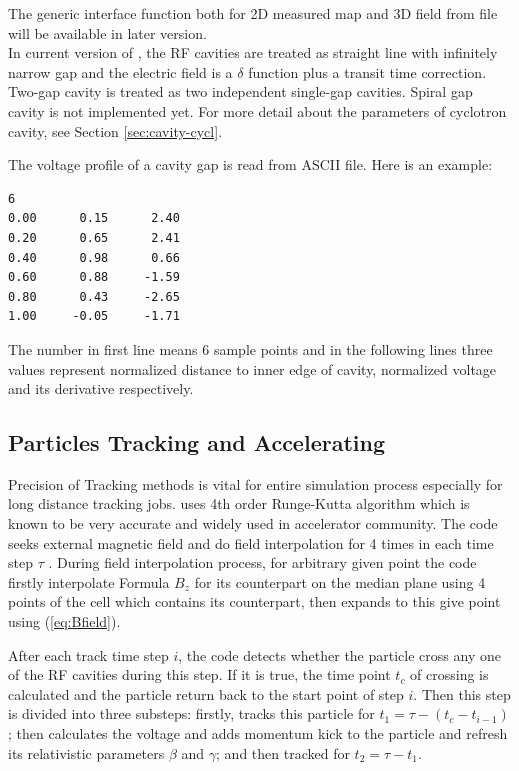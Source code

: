 The generic interface function both for 2D measured map and 3D field from file will be available in later version.\\ 

In current version of \opalcycl, the RF cavities are treated as straight line with infinitely narrow gap 
and the electric field is a $\delta$ function plus a transit time correction.
Two-gap cavity is treated as two independent single-gap cavities. Spiral gap cavity is not implemented yet.
For more detail about the parameters of cyclotron cavity, see Section \ref{sec:cavity-cycl}.

The voltage profile of a cavity gap  is read from ASCII file. Here is an example:
\begin{verbatim}
6  
0.00      0.15      2.40 
0.20      0.65      2.41 
0.40      0.98      0.66 
0.60      0.88     -1.59 
0.80      0.43     -2.65 
1.00     -0.05     -1.71 
\end{verbatim}
The number in first line means 6 sample points and in the following lines three values represent normalized distance to 
inner edge of cavity, normalized voltage and its derivative respectively.

\subsection{Particles Tracking and Accelerating}  

Precision of Tracking methods is vital for entire simulation process especially for long distance tracking jobs.
\opalcycl uses 4th order Runge-Kutta algorithm which is known to be very accurate and widely used in accelerator 
community. The code seeks external magnetic field and do field interpolation for 4 times in each time step $\tau$ .
During field interpolation process, for arbitrary given point the code firstly interpolate Formula $B_z$
for its counterpart on the median plane using 4 points of the cell which contains its counterpart,
then expands to this give point using (\ref{eq:Bfield}). 

After each track time step $i$, the code detects whether the particle cross any one of the RF cavities during this step.
If it is true, the time point $t_c$ of crossing is calculated and the particle return back to the start point of 
step $i$. Then this step is divided into three substeps:
firstly, tracks this particle for $ t_1 = \tau - (t_c-t_{i-1})$;
then calculates the voltage and adds momentum kick to the particle and refresh its relativistic parameters $\beta$ and $\gamma$; 
and then tracked for $t_2 = \tau - t_1$. 

